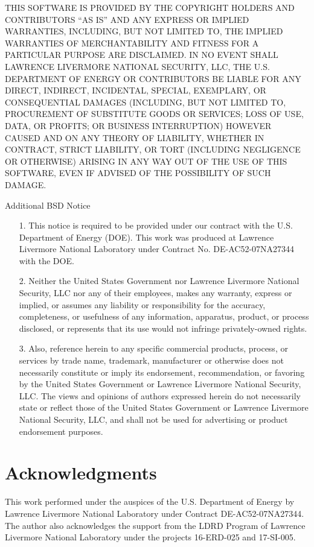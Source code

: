 \begin{center}
{\begin{minipage}{0.9\textwidth}
\noindent THIS SOFTWARE IS PROVIDED BY THE COPYRIGHT HOLDERS AND CONTRIBUTORS ``AS IS'' AND ANY 
EXPRESS OR IMPLIED WARRANTIES, INCLUDING, BUT NOT LIMITED TO, THE IMPLIED WARRANTIES 
OF MERCHANTABILITY AND FITNESS FOR A PARTICULAR PURPOSE ARE DISCLAIMED. IN NO EVENT 
SHALL LAWRENCE LIVERMORE NATIONAL SECURITY, LLC, THE U.S. DEPARTMENT OF ENERGY OR 
CONTRIBUTORS BE LIABLE FOR ANY DIRECT, INDIRECT, INCIDENTAL, SPECIAL, EXEMPLARY, OR 
CONSEQUENTIAL DAMAGES (INCLUDING, BUT NOT LIMITED TO, PROCUREMENT OF SUBSTITUTE GOODS 
OR SERVICES; LOSS OF USE, DATA, OR PROFITS; OR BUSINESS INTERRUPTION) HOWEVER CAUSED 
AND ON ANY THEORY OF LIABILITY, WHETHER IN CONTRACT, STRICT LIABILITY, OR TORT 
(INCLUDING NEGLIGENCE OR OTHERWISE) ARISING IN ANY WAY OUT OF THE USE OF THIS SOFTWARE, 
EVEN IF ADVISED OF THE POSSIBILITY OF SUCH DAMAGE.

\medskip

Additional BSD Notice
\begin{itemize}
\item[1.] This notice is required to be provided under our contract with the U.S. Department 
of Energy (DOE). This work was produced at Lawrence Livermore National Laboratory under 
Contract No. DE-AC52-07NA27344 with the DOE.
\item[2.] Neither the United States Government nor Lawrence Livermore National Security, LLC 
nor any of their employees, makes any warranty, express or implied, or assumes any 
liability or responsibility for the accuracy, completeness, or usefulness of any 
information, apparatus, product, or process disclosed, or represents that its use would
not infringe privately-owned rights.
\item[3.] Also, reference herein to any specific commercial products, process, or services by 
trade name, trademark, manufacturer or otherwise does not necessarily constitute or 
imply its endorsement, recommendation, or favoring by the United States Government or 
Lawrence Livermore National Security, LLC. The views and opinions of authors expressed 
herein do not necessarily state or reflect those of the United States Government or 
Lawrence Livermore National Security, LLC, and shall not be used for advertising or 
product endorsement purposes.
\end{itemize}
\end{minipage}}\end{center}

\section{Acknowledgments}
This work performed under the auspices of the U.S. Department of Energy by Lawrence Livermore National Laboratory under Contract DE-AC52-07NA27344. The author also acknowledges the support from the LDRD Program of Lawrence Livermore National Laboratory under the projects 16-ERD-025 and 17-SI-005.



